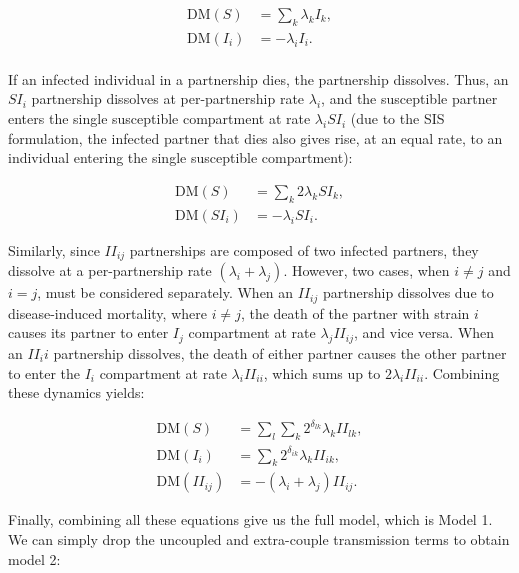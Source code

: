 \documentclass[10pt,letterpaper]{article}
\newcommand{\DM}{\textrm{DM}}
\begin{document}
\begin{equation}
\begin{aligned}
\DM(S) &= \sum_k \lambda_k I_k, \\
\DM(I_i) &= - \lambda_i I_i. \\
\end{aligned}
\end{equation}

If an infected individual in a partnership dies, the partnership dissolves. Thus, an $SI_i$ partnership dissolves at per-partnership rate $\lambda_i$, and the susceptible partner enters the single susceptible compartment at rate $\lambda_i SI_i$ (due to the SIS formulation, the infected partner that dies also gives rise, at an equal rate, to an individual entering the single susceptible compartment):

\begin{equation}
\begin{aligned}
\DM(S) &= \sum_k 2 \lambda_k SI_k, \\
\DM(SI_i) &= - \lambda_i SI_i.
\end{aligned}
\end{equation}

Similarly, since $II_{ij}$ partnerships are composed of two infected partners, they dissolve at a per-partnership rate $(\lambda_i + \lambda_j)$. However, two cases, when $i \neq j$ and $i = j$, must be considered separately. When an $II_{ij}$ partnership dissolves due to disease-induced mortality, where $i \neq j$, the death of the partner with strain $i$ causes its partner to enter $I_j$ compartment at rate $\lambda_j II_{ij}$, and vice versa. When an $II_ii$ partnership dissolves, the death of either partner causes the other partner to enter the $I_i$ compartment at rate $\lambda_i II_{ii}$, which sums up to $2\lambda_i II_{ii}$. Combining these dynamics yields:

\begin{equation}
\begin{aligned}
\DM(S) &= \sum_l \sum_k  2^{\delta_{lk}} \lambda_k II_{lk}, \\
\DM(I_i) &=  \sum_k 2^{\delta_{ik}} \lambda_k II_{ik}, \\
\DM(II_{ij}) &= -(\lambda_i + \lambda_j) II_{ij}.
\end{aligned}
\end{equation}

Finally, combining all these equations give us the full model, which is Model 1. We can simply drop the uncoupled and extra-couple transmission terms to obtain model 2:
\end{document}
